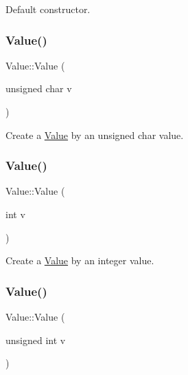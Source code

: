 Default constructor. \mbox{\label{classValue_aabe730986b0548c9de3e52ea086e6b8c}} 
\subsubsection{\texorpdfstring{Value()}{Value()}\hspace{0.1cm}{\footnotesize\ttfamily [2/34]}}
{\footnotesize\ttfamily Value\+::\+Value (\begin{DoxyParamCaption}\item[{unsigned char}]{v }\end{DoxyParamCaption})\hspace{0.3cm}{\ttfamily [explicit]}}

Create a \hyperlink{classValue}{Value} by an unsigned char value. \mbox{\label{classValue_ad66a1aec17bd011f542d70e8dcf85739}} 
\subsubsection{\texorpdfstring{Value()}{Value()}\hspace{0.1cm}{\footnotesize\ttfamily [3/34]}}
{\footnotesize\ttfamily Value\+::\+Value (\begin{DoxyParamCaption}\item[{int}]{v }\end{DoxyParamCaption})\hspace{0.3cm}{\ttfamily [explicit]}}

Create a \hyperlink{classValue}{Value} by an integer value. \mbox{\label{classValue_aca420574da40e0503bbb5b3c124a19b4}} 
\subsubsection{\texorpdfstring{Value()}{Value()}\hspace{0.1cm}{\footnotesize\ttfamily [4/34]}}
{\footnotesize\ttfamily Value\+::\+Value (\begin{DoxyParamCaption}\item[{unsigned int}]{v }\end{DoxyParamCaption})\hspace{0.3cm}{\ttfamily [explicit]}}

